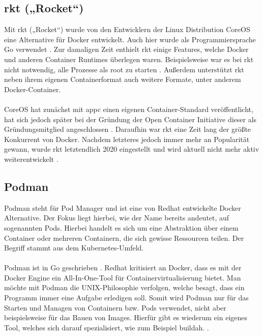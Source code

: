 \subsection{rkt („Rocket“)}
Mit rkt („Rocket“) wurde von den Entwicklern der Linux Distribution CoreOS eine Alternative für Docker entwickelt. Auch hier wurde als Programmiersprache Go verwendet \cite{noauthor_rkt_2021}. Zur damaligen Zeit enthielt rkt einige Features, welche Docker und anderen Container Runtimes überlegen waren. Beispielsweise war es bei rkt nicht notwendig, alle Prozesse als root zu starten \cite{evan_baker_comprehensive_2021}. Außerdem unterstützt rkt neben ihrem eigenen Containerformat auch weitere Formate, unter anderem Docker-Container.
\\\\
CoreOS hat zunächst mit appc einen eigenen Container-Standard veröffentlicht, hat sich jedoch später bei der Gründung der Open Container Initiative dieser als Gründungsmitglied angeschlossen \cite{evan_baker_comprehensive_2021}. Daraufhin war rkt eine Zeit lang der größte Konkurrent von Docker. Nachdem letzteres jedoch immer mehr an Popularität gewann, wurde rkt letztendlich 2020 eingestellt und wird aktuell nicht mehr aktiv weiterentwickelt \cite{noauthor_rkt_2021}.

\subsection{Podman}
Podman steht für Pod Manager und ist eine von Redhat entwickelte Docker Alternative. Der Fokus liegt hierbei, wie der Name bereits andeutet, auf sogenannten Pods. Hierbei handelt es sich um eine Abstraktion über einem Container oder mehreren Containern, die sich gewisse Ressourcen teilen. Der Begriff stammt aus dem Kubernetes-Umfeld.
\\\\
Podman ist in Go geschrieben \cite{noauthor_podman_2021}. Redhat kritisiert an Docker, dass es mit der Docker Engine ein All-In-One-Tool für Containervirtualisierung bietet. Man möchte mit Podman die UNIX-Philosophie verfolgen, welche besagt, dass ein Programm immer eine Aufgabe erledigen soll. Somit wird Podman nur für das Starten und Managen von Containern bzw. Pods verwendet, nicht aber beispielsweise für das Bauen von Images. Hierfür gibt es wiederum ein eigenes Tool, welches sich darauf spezialisiert, wie zum Beispiel buildah. \cite{evan_baker_comprehensive_2021}.

